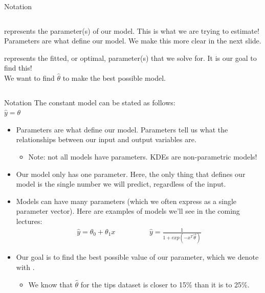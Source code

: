 \documentclass[aspectratio=169]{../latex_main/tntbeamer}  %
\begin{document}
\begin{frame}{Notation}
\begin{columns}
\begin{column}{.9\textwidth}
                    \bigskip
                    represents the parameter(s) of our model. This is what we are trying to estimate!\\
                    Parameters are what define our model. We make this more clear in the next slide.
                    
                    \vspace{.75cm}
                    represents the fitted, or optimal, parameter(s) that we solve for. It is our goal to find this!\\
                    We want to find   $\hat{\theta}$   to make the best possible model.

	        \end{column}
	    \end{columns}
	\end{frame}
	
	
	
	
	\begin{frame}{Notation}
	    The constant model can be stated as follows:\\ 
	    \hspace{7cm} $\hat{y} = \theta$
	    \begin{itemize}
	        \item Parameters are what define our model. Parameters tell us what the relationships between our input and output variables are.
	        \begin{itemize}
	            \item Note: not all models have parameters. KDEs are non-parametric models!
	        \end{itemize}
	        \item Our model only has one parameter. Here, the only thing that defines our model is the single number we will predict, regardless of the input.
	        \item Models can have many parameters (which we often express as a single parameter vector). Here are examples of models we’ll see in the coming lectures:
	        \begin{align*}
	            \hat{y} = \theta_0 + \theta_1 x \hspace{2cm} \hat{y} = \frac{1}{1+ exp(-x^T\Vec{\theta})}
	        \end{align*}
	        \item Our goal is to find the best possible value of our parameter, which we denote with  \hat{\theta}.
	        \begin{itemize}
	            \item We know that   $\hat{\theta}$    for the tips dataset is closer to 15\% than it is to 25\%.
	        \end{itemize}
	    \end{itemize}
	\end{frame}
	
\end{document}
